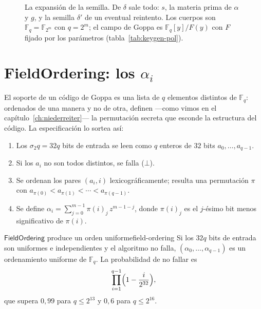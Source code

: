 \documentclass[11pt,a4paper,oneside]{report}
\newcommand{\GF}[1]{\mathbb{F}_{#1}}
\begin{document}
\begin{figure}[htbp]
\caption{La expansión de la semilla. De $\delta$ sale todo: $s$, la
materia prima de $\alpha$ y $g$, y la semilla $\delta'$ de un eventual
reintento. Los cuerpos son $\GF q=\GF{2^m}$ con $q=2^m$; el campo de
Goppa es $\GF q[y]/F(y)$ con $F$ fijado por los parámetros
(tabla~\ref{tab:keygen-pol}).}
\label{fig:keygen-semilla}
\end{figure}

\section{\textsf{FieldOrdering}: los $\alpha_i$}

El soporte de un código de Goppa es una lista de $q$ elementos
distintos de $\GF q$: ordenados de una manera y no de otra, definen
---como vimos en el capítulo~\ref{ch:niederreiter}--- la permutación
secreta que esconde la estructura del código. La especificación lo
sortea así:

\begin{enumerate}[leftmargin=1.8em,itemsep=2pt]
  \item Los $\sigma_2q=32q$ bits de entrada se leen como $q$ enteros de
        $32$ bits $a_0,\dots,a_{q-1}$.
  \item Si los $a_i$ no son todos distintos, se falla ($\bot$).
  \item Se ordenan los pares $(a_i,i)$ lexicográficamente; resulta una
        permutación $\pi$ con $a_{\pi(0)}<a_{\pi(1)}<\cdots<
        a_{\pi(q-1)}$.
  \item Se define $\alpha_i=\sum_{j=0}^{m-1}\pi(i)_j\,z^{m-1-j}$, donde
        $\pi(i)_j$ es el $j$-ésimo bit menos significativo de
        $\pi(i)$.
\end{enumerate}

\begin{proposicion}{$\textsf{FieldOrdering}$ produce un orden uniforme}{field-ordering}
Si los $32q$ bits de entrada son uniformes e independientes y el
algoritmo no falla, $(\alpha_0,\dots,\alpha_{q-1})$ es un ordenamiento
uniforme de $\GF q$. La probabilidad de no fallar es
\[
  \prod_{i=1}^{q-1}\Bigl(1-\frac{i}{2^{32}}\Bigr),
\]
que supera $0{,}99$ para $q\le2^{13}$ y $0{,}6$ para $q\le2^{16}$.
\end{proposicion}
\end{document}
